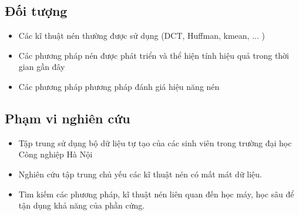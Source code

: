 \subsection{Đối tượng}
\begin{itemize}
      \item Các kĩ thuật nén thường được sử dụng (DCT, Huffman, kmean, ... )
      \item Các phương pháp nén được phát triển và thể hiện tính hiệu quả trong thời gian gần đây
      \item Các phương pháp phương pháp đánh giá hiệu năng nén
\end{itemize}
\newpage
\subsection{Phạm vi nghiên cứu}
\begin{itemize}
      \item Tập trung sử dụng bộ dữ liệu tự tạo của các sinh viên trong trường đại học Công nghiệp Hà Nội
      \item Nghiên cứu tập trung chủ yếu các kĩ thuật nén có mất mát dữ liệu.
      \item Tìm kiếm các phương pháp, kĩ thuật nén liên quan đến học máy, học sâu để
            tận dụng khả năng của phần cứng.
\end{itemize}





